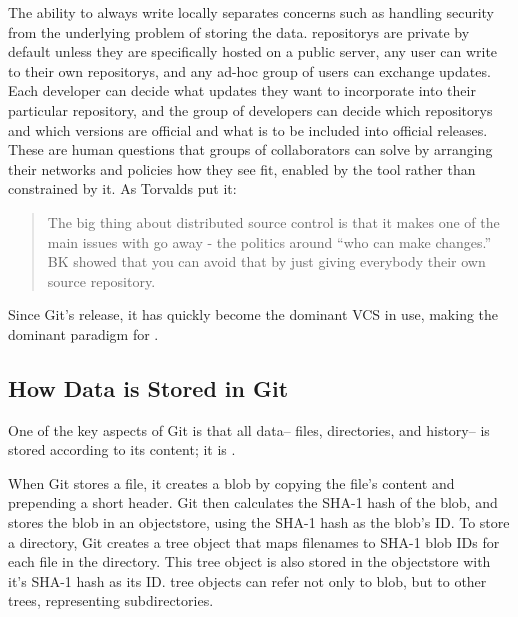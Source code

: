 The ability to always write locally separates concerns such as handling security
from the underlying problem of storing the data. \glspl{repository} are private
by default unless they are specifically hosted on a public server, any user can
write to their own \glspl{repository}, and any ad-hoc group of users can
exchange updates. Each developer can decide what updates they want to
incorporate into their particular \gls{repository}, and the group of developers
can decide which \glspl{repository} and which versions are official and what is
to be included into official releases. These are human questions that groups of
collaborators can solve by arranging their networks and policies how they see
fit, enabled by the tool rather than constrained by it. As Torvalds put it:

\blockcquote{git_10_years_interview}{The big thing about distributed source
    control is that it makes one of the main issues with  go
    away - the politics around \enquote{who can make changes.} BK
     showed that you can avoid that by just giving everybody
their own source \gls{repository}. }

Since Git's release, it has quickly become the dominant \gls{VCS} in
use\cite{what_are_devs_talking_about}, making  the dominant paradigm for .

%


\subsection{How Data is Stored in Git}
\label{how-data-stored-in-git}

One of the key aspects of Git is that all data-- files, directories, and
history-- is stored according to its content; it is .

When Git stores a file, it creates a \gls{blob} by copying the file's content
and prepending a short header. Git then calculates the SHA-1 hash of the
\gls{blob}, and stores the \gls{blob} in an \gls{objectstore}, using the SHA-1
hash as the \gls{blob}'s ID. To store a directory, Git creates a \gls{tree}
object that maps filenames to SHA-1 \gls{blob} IDs for each file in the
directory. This \gls{tree} object is also stored in the \gls{objectstore} with
it's SHA-1 hash as its ID. \Gls{tree} objects can refer not only to \gls{blob},
but to other \glspl{tree}, representing subdirectories.

